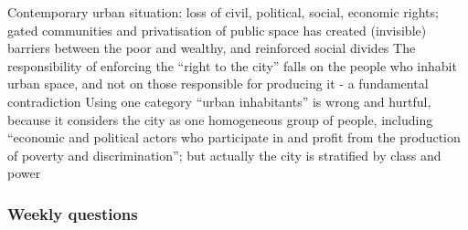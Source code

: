 \documentclass{article}
\begin{document}
\begin{outline}
	\1 Contemporary urban situation: loss of civil, political, social, economic rights; gated communities and privatisation of public space has created (invisible) barriers between the poor and wealthy, and reinforced social divides
	\1 The responsibility of enforcing the ``right to the city'' falls on the people who inhabit urban space, and not on those responsible for producing it - a fundamental contradiction 
		\2 Using one category ``urban inhabitants'' is wrong and hurtful, because it considers the city as one homogeneous group of people, including ``economic and political actors who participate in and profit from the production of poverty and discrimination''; but actually the city is stratified by class and power
\end{outline}

\subsubsection{Weekly questions}
\end{document}
